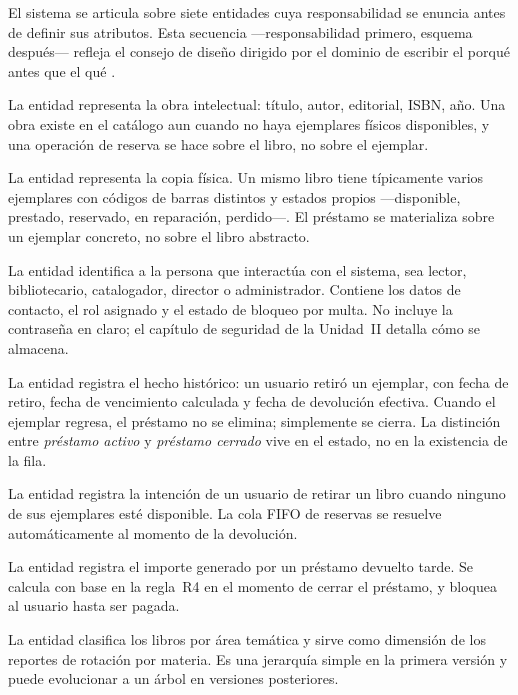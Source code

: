 El sistema se articula sobre siete entidades cuya responsabilidad se enuncia antes de definir sus atributos. Esta secuencia ---responsabilidad primero, esquema despu\'es--- refleja el consejo de dise\~no dirigido por el dominio de escribir el porqu\'e antes que el qu\'e \cite{evans2003ddd}.

La entidad  representa la obra intelectual: t\'itulo, autor, editorial, ISBN, a\~no. Una obra existe en el cat\'alogo aun cuando no haya ejemplares f\'isicos disponibles, y una operaci\'on de reserva se hace sobre el libro, no sobre el ejemplar.

La entidad  representa la copia f\'isica. Un mismo libro tiene t\'ipicamente varios ejemplares con c\'odigos de barras distintos y estados propios ---disponible, prestado, reservado, en reparaci\'on, perdido---. El pr\'estamo se materializa sobre un ejemplar concreto, no sobre el libro abstracto.

La entidad  identifica a la persona que interact\'ua con el sistema, sea lector, bibliotecario, catalogador, director o administrador. Contiene los datos de contacto, el rol asignado y el estado de bloqueo por multa. No incluye la contrase\~na en claro; el cap\'itulo de seguridad de la Unidad~II detalla c\'omo se almacena.

La entidad  registra el hecho hist\'orico: un usuario retir\'o un ejemplar, con fecha de retiro, fecha de vencimiento calculada y fecha de devoluci\'on efectiva. Cuando el ejemplar regresa, el pr\'estamo no se elimina; simplemente se cierra. La distinci\'on entre \emph{pr\'estamo activo} y \emph{pr\'estamo cerrado} vive en el estado, no en la existencia de la fila.

La entidad  registra la intenci\'on de un usuario de retirar un libro cuando ninguno de sus ejemplares est\'e disponible. La cola FIFO de reservas se resuelve autom\'aticamente al momento de la devoluci\'on.

La entidad  registra el importe generado por un pr\'estamo devuelto tarde. Se calcula con base en la regla~R4 en el momento de cerrar el pr\'estamo, y bloquea al usuario hasta ser pagada.

La entidad  clasifica los libros por \'area tem\'atica y sirve como dimensi\'on de los reportes de rotaci\'on por materia. Es una jerarqu\'ia simple en la primera versi\'on y puede evolucionar a un \'arbol en versiones posteriores.

